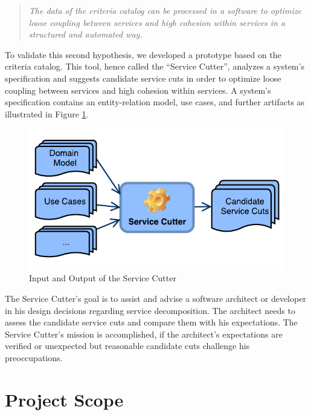 \begin{quote}
	\textit{The data of the criteria catalog can be processed in a software to optimize loose coupling between services and high cohesion within services in a structured and automated way.}
\end{quote}

To validate this second hypothesis, we developed a prototype based on the criteria catalog. This tool, hence called the \enquote{Service Cutter}, analyzes a system's specification and suggests candidate service cuts in order to optimize loose coupling between services and high cohesion within services. A system's specification contains an entity-relation model, use cases, and further artifacts as illustrated in Figure \ref{fig:serviceCutterIO}.

\begin{figure}[H]
	\begin{center}
		\includegraphics[scale=1.1]{diagrams/systemContextDiagram.pdf}
	\end{center}
	\caption{Input and Output of the Service Cutter}
	\label{fig:serviceCutterIO}
\end{figure}

The Service Cutter's goal is to assist and advise a software architect or developer in his design decisions regarding service decomposition. The architect needs to assess the candidate service cuts and compare them with his expectations. The Service Cutter's mission is accomplished, if the architect's expectations are verified or unexpected but reasonable candidate cuts challenge his preoccupations. 

\section{Project Scope}

